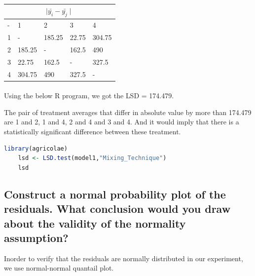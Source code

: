 \documentclass[11pt]{article}
\begin{document}
\paragraph{}
\begin{tabular}{ |p{1cm}|p{1cm}|p{1cm}|p{1cm}|p{1cm}|  }
    \hline
    \multicolumn{5}{|c|}{$\displaystyle \mid \bar{y_i} - \bar{y_j} \mid$ } \\
    \hline
     - & 1 & 2 & 3 & 4 \\ \hline
    1 & - & \cellcolor{gray!30} 185.25 & 22.75 & \cellcolor{gray!30}304.75 \\ \hline
    2 & \cellcolor{gray!30} 185.25 & - & 162.5 & \cellcolor{gray!30}490 \\ \hline
    3 & 22.75 & 162.5 & - & \cellcolor{gray!30}327.5 \\ \hline
    4 & \cellcolor{gray!30}304.75 & \cellcolor{gray!30}490 & \cellcolor{gray!30}327.5 & - \\ \hline
\end{tabular}

\paragraph{}
Using the below R program, we got the LSD = 174.479.

The pair of treatment averages that differ in absolute value by more than 174.479 are {1 and 2}, {1 and 4}, {2 and 4} and {3 and 4}.
And it would imply that there is a statistically significant difference between these treatment.

\clearpage

\begin{lstlisting}[language=R]
    library(agricolae)
    lsd <- LSD.test(model1,"Mixing_Technique")
    lsd
\end{lstlisting}



   
\clearpage

\subsection{Construct a normal probability plot of the residuals. What conclusion would you draw about the validity of the normality assumption?}

Inorder to verify that the residuals are normally distributed in our experiment, we use
normal-normal quantail plot. 
\end{document}
